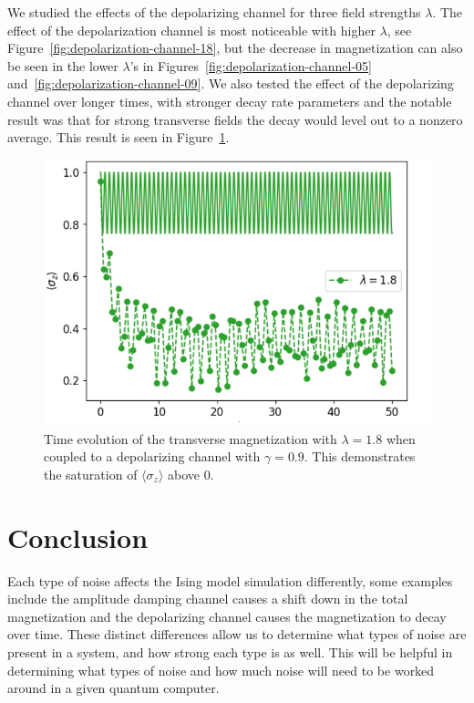 \documentclass[12pt, twocolumn]{article}
\begin{document}
  We studied the effects of the depolarizing channel for three field strengths \( \lambda \). The effect of the depolarization channel is most noticeable with higher \( \lambda \), see Figure~\ref{fig:depolarization-channel-18}, but the decrease in magnetization can also be seen in the lower \( \lambda \)'s in Figures~\ref{fig:depolarization-channel-05} and~\ref{fig:depolarization-channel-09}. We also tested the effect of the depolarizing channel over longer times, with stronger decay rate parameters and the notable result was that for strong transverse fields the decay would level out to a nonzero average. This result is seen in Figure~\ref{fig:depolarization-channel-18-long}.
  \begin{figure}
    \centering
    \includegraphics[width=\linewidth]{images/depolarization_channel_18_long.png}
    \caption{Time evolution of the transverse magnetization with \( \lambda = 1.8 \) when coupled to a depolarizing channel with \( \gamma = 0.9 \). This demonstrates the saturation of \( \langle \sigma_{z} \rangle \) above \( 0 \).%
      \label{fig:depolarization-channel-18-long}}
  \end{figure}

  \section{Conclusion}
  Each type of noise affects the Ising model simulation differently, some examples include the amplitude damping channel causes a shift down in the total magnetization and the depolarizing channel causes the magnetization to decay over time. These distinct differences allow us to determine what types of noise are present in a system, and how strong each type is as well. This will be helpful in determining what types of noise and how much noise will need to be worked around in a given quantum computer.

  \printbibliography
\end{document}
